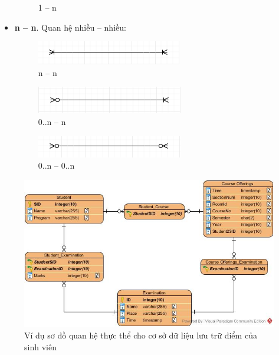 \documentclass{article}
\begin{document}
\begin{itemize}
\begin{figure}[!ht]
      \caption{1 -- n}
    \end{figure}
    \item \textbf{n -- n}. Quan hệ nhiều -- nhiều:
    \begin{figure}[!ht]
      \centering
      \includegraphics[scale=1]{../pictures/diagrams/entityrelationship/Many-mandatory-to-Many-mandatory.PNG}
      \caption{n -- n}
    \end{figure}
    \begin{figure}[!ht]
      \centering
      \includegraphics[scale=1]{../pictures/diagrams/entityrelationship/Many-optional-to-Many-mandatory.PNG}
      \caption{0..n -- n}
    \end{figure}
    \begin{figure}[!ht]
      \centering
      \includegraphics[scale=1]{../pictures/diagrams/entityrelationship/Many-optional-to-Many-optional.PNG}
      \caption{0..n -- 0..n}
    \end{figure}
  \end{itemize}

  \begin{figure}[!ht]
    \centering
    \includegraphics[scale=0.5]{../pictures/diagrams/entityrelationship/entity-relationship-diagram-1.jpg}
    \caption{Ví dụ sơ đồ quan hệ thực thể cho cơ sở dữ liệu lưu trữ điểm của sinh viên}
  \end{figure}
\end{document}

